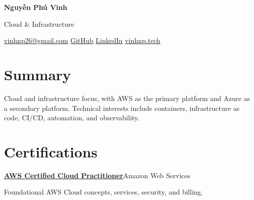 \documentclass[11pt,a4paper]{article}
\makeatletter
\newcommand{\fullname}{Nguyễn Phú Vinh}
\newcommand{\emailaddress}{vinhnp26@gmail.com}
\newcommand{\githuburl}{https://github.com/vincody}
\newcommand{\linkedinurl}{https://www.linkedin.com/in/phuvinh26/}
\newcommand{\portfoliourl}{https://vinhnp.tech}
\newcommand{\credentialurl}{https://www.credly.com/badges/bddba3a8-8c81-4882-9382-352f6247ba9e/public_url}
\newcommand{\educationdates}{} %
\newif\ifshoweducation
\newif\ifshowexperience
\newcommand{\entry}[4]{%
  \Needspace{4\baselineskip}%
  \textbf{#1}\hfill #2\par
  \textit{#3}\hfill \textit{#4}\par
}
\makeatother
\begin{document}
\begin{center}
  {\fontsize{20}{24}\selectfont\bfseries \fullname}\par
  \vspace{3pt}
  Cloud \& Infrastructure\par
  \vspace{2pt}
  {\small
    \href{mailto:\emailaddress}{\faEnvelope\enspace\emailaddress}\quad
    \href{\githuburl}{\faGithub\enspace GitHub}\quad
    \href{\linkedinurl}{\faLinkedin\enspace LinkedIn}\quad
    \href{\portfoliourl}{\faGlobe\enspace vinhnp.tech}
  }
\end{center}
\vspace{-4pt}

\section{Summary}
Cloud and infrastructure focus, with AWS as the primary platform and Azure
as a secondary platform. Technical interests include containers,
infrastructure as code, CI/CD, automation, and observability.

\ifshoweducation
\section{Education}
\textbf{University of Information Technology (UIT) - VNU-HCM}\par
\textit{Major: Computer Networks and Data Communications}\hfill \educationdates
\fi

\ifshowexperience
\section{Experience}
\fi

\section{Certifications}
\href{\credentialurl}{\textbf{AWS Certified Cloud Practitioner}}\hfill Amazon Web Services\par
Foundational AWS Cloud concepts, services, security, and billing.\par
\end{document}
